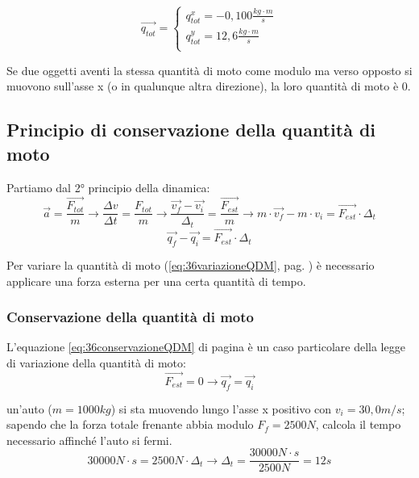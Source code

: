     \begin{equation*}
        \vec{q_{tot}}=
        \begin{cases}
            q_{tot}^x=-0,100 \frac{kg\cdot m}{s}\\
            q_{tot}^y=12,6 \frac{kg\cdot m}{s}\\
        \end{cases}
    \end{equation*}
    \par Se due oggetti aventi la stessa quantità di moto come modulo ma verso opposto si muovono sull'asse x (o in qualunque altra direzione), la loro quantità di moto è 0.
    \subsection{Principio di conservazione della quantità di moto}
    \par Partiamo dal 2° principio della dinamica:
    \begin{equation*}
    	\vec{a}=\frac{\vec{F_{tot}}}{m}\rightarrow
    	\frac{\Delta v}{\Delta t}=\frac{F_{tot}}{m} \rightarrow
    	\frac{\vec{v_f}-\vec{v_i}}{\Delta_t}=\frac{\vec{F_{est}}}{m}\rightarrow
    	m\cdot\vec{v_f}-m\cdot{v_i}=\vec{F_{est}}\cdot \Delta_t
    \end{equation*}
    \begin{equation} \label{eq:36variazioneQDM}
    	\vec{q_f}-\vec{q_i}=\vec{F_{est}}\cdot \Delta_t
    \end{equation}
    \par Per variare la quantità di moto (\ref{eq:36variazioneQDM}, pag. \pageref{eq:36conservazioneQDM}) è necessario applicare una forza esterna per una certa quantità di tempo.
    \subsubsection{Conservazione della quantità di moto}
    \par L'equazione \ref{eq:36conservazioneQDM} di pagina \pageref{eq:36conservazioneQDM} è un caso particolare della legge di variazione della quantità di moto:
    \begin{equation} \label{eq:36conservazioneQDM}
    	\vec{F_{est}}=0\rightarrow\vec{q_f}=\vec{q_i}
    \end{equation}
    \par\esempio un'auto ($m=1000kg$) si sta muovendo lungo l'asse x positivo con $v_i=30,0 m/s$; sapendo che la forza totale frenante abbia modulo $F_f=2500 N$, calcola il tempo necessario affinché l'auto si fermi.
    \begin{equation*}
    30000 N\cdot{s}=2500 N \cdot \Delta_t \rightarrow
    \Delta_t=\frac{30000N\cdot{s}}{2500 N}=12 s
    \end{equation*}
